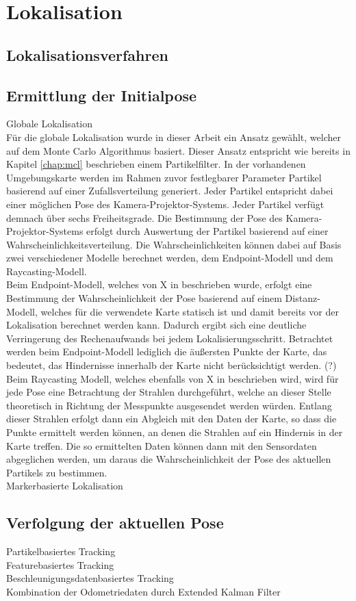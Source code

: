 \chapter{Lokalisation}

\section{Lokalisationsverfahren}

\section{Ermittlung der Initialpose}
Globale Lokalisation\\
Für die globale Lokalisation wurde in dieser Arbeit ein Ansatz gewählt, welcher auf dem Monte Carlo Algorithmus basiert. Dieser Ansatz entspricht wie bereits in Kapitel \ref{chap:mcl} beschrieben einem Partikelfilter. In der vorhandenen Umgebungskarte werden im Rahmen zuvor festlegbarer Parameter Partikel basierend auf einer Zufallsverteilung generiert. Jeder Partikel entspricht dabei einer möglichen Pose des Kamera-Projektor-Systems. Jeder Partikel verfügt demnach über sechs Freiheitsgrade. Die Bestimmung der Pose des Kamera-Projektor-Systems erfolgt durch Auswertung der Partikel basierend auf einer Wahrscheinlichkeitsverteilung. Die Wahrscheinlichkeiten können dabei auf Basis zwei verschiedener Modelle berechnet werden, dem Endpoint-Modell und dem Raycasting-Modell.\\
Beim Endpoint-Modell, welches von X in \cite{Endpoint} beschrieben wurde, erfolgt eine Bestimmung der Wahrscheinlichkeit der Pose basierend auf einem Distanz-Modell, welches für die verwendete Karte  statisch ist und damit bereits vor der Lokalisation berechnet werden kann. Dadurch ergibt sich eine deutliche Verringerung des Rechenaufwands bei jedem Lokalisierungsschritt. Betrachtet werden beim Endpoint-Modell lediglich die äußersten Punkte der Karte, das bedeutet, das Hindernisse innerhalb der Karte nicht berücksichtigt werden. (?)\\
Beim Raycasting Modell, welches ebenfalls von X in \cite{Raycasting} beschrieben wird, wird für jede Pose eine Betrachtung der Strahlen durchgeführt, welche an dieser Stelle theoretisch in Richtung der Messpunkte ausgesendet werden würden. Entlang dieser Strahlen erfolgt dann ein Abgleich mit den Daten der Karte, so dass die Punkte ermittelt werden können, an denen die Strahlen auf ein Hindernis in der Karte treffen. Die so ermittelten Daten können dann mit den Sensordaten abgeglichen werden, um daraus die Wahrscheinlichkeit der Pose des aktuellen Partikels zu bestimmen.\\
Markerbasierte Lokalisation\\

\section{Verfolgung der aktuellen Pose}
Partikelbasiertes Tracking\\
Featurebasiertes Tracking\\
Beschleunigungsdatenbasiertes Tracking\\
Kombination der Odometriedaten durch Extended Kalman Filter\\